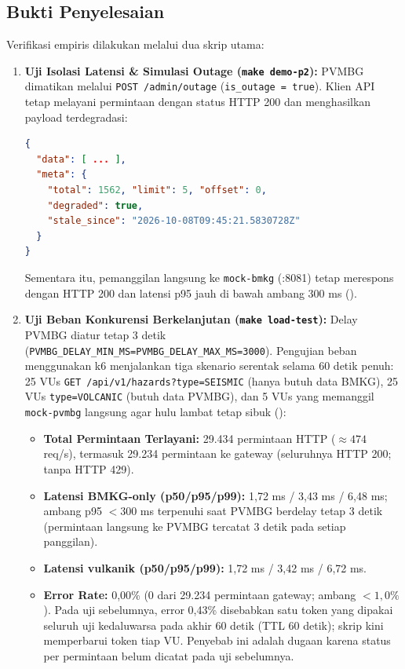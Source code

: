 \subsection{Bukti Penyelesaian}
Verifikasi empiris dilakukan melalui dua skrip utama:
\begin{enumerate}
    \item \textbf{Uji Isolasi Latensi \& Simulasi Outage (\texttt{make demo-p2}):}
    PVMBG dimatikan melalui \texttt{POST /admin/outage} (\texttt{is\_outage = true}). Klien API tetap melayani permintaan dengan status HTTP 200 dan menghasilkan payload terdegradasi:

\noindent\begin{minipage}{\linewidth}
\begin{lstlisting}[language=json, caption={Respons Klien API dalam Keadaan Terdegradasi (meta.degraded = true)}]
{
  "data": [ ... ],
  "meta": {
    "total": 1562, "limit": 5, "offset": 0,
    "degraded": true,
    "stale_since": "2026-10-08T09:45:21.5830728Z"
  }
}
\end{lstlisting}
\end{minipage}
    Sementara itu, pemanggilan langsung ke \texttt{mock-bmkg} (:8081) tetap merespons dengan HTTP 200 dan latensi p95 jauh di bawah ambang 300 ms ().

    \item \textbf{Uji Beban Konkurensi Berkelanjutan (\texttt{make load-test}):}
    Delay PVMBG diatur tetap 3 detik (\texttt{PVMBG\_DELAY\_MIN\_MS=PVMBG\_DELAY\_MAX\_MS=3000}). Pengujian beban menggunakan k6 menjalankan tiga skenario serentak selama 60 detik penuh: 25 VUs \texttt{GET /api/v1/hazards?type=SEISMIC} (hanya butuh data BMKG), 25 VUs \texttt{type=VOLCANIC} (butuh data PVMBG), dan 5 VUs yang memanggil \texttt{mock-pvmbg} langsung agar hulu lambat tetap sibuk ():
    \begin{itemize}
        \item \textbf{Total Permintaan Terlayani:} 29.434 permintaan HTTP ($\approx 474$ req/s), termasuk 29.234 permintaan ke gateway (seluruhnya HTTP 200; tanpa HTTP 429).
        \item \textbf{Latensi BMKG-only (p50/p95/p99):} 1,72 ms / 3,43 ms / 6,48 ms; ambang p95 $< 300$ ms terpenuhi saat PVMBG berdelay tetap 3 detik (permintaan langsung ke PVMBG tercatat 3 detik pada setiap panggilan).
        \item \textbf{Latensi vulkanik (p50/p95/p99):} 1,72 ms / 3,42 ms / 6,72 ms.
        \item \textbf{Error Rate:} 0,00\% (0 dari 29.234 permintaan gateway; ambang $< 1,0\%$). Pada uji sebelumnya, error 0,43\% disebabkan satu token yang dipakai seluruh uji kedaluwarsa pada akhir 60 detik (TTL 60 detik); skrip kini memperbarui token tiap VU. Penyebab ini adalah dugaan karena status per permintaan belum dicatat pada uji sebelumnya.
    \end{itemize}
\end{enumerate}

